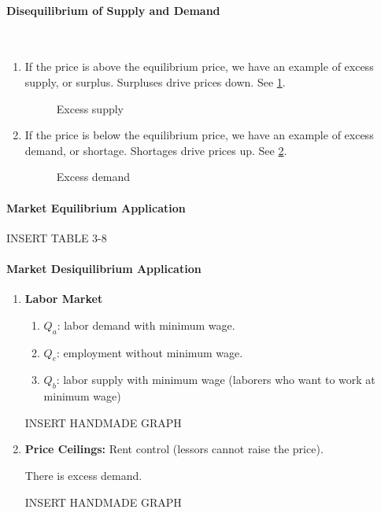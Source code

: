 \paragraph{Disequilibrium of Supply and Demand}\ 

\begin{enumerate}[label = \textbullet]

	\item If the price is above the equilibrium price, we have an example of excess supply, or surplus.
		Surpluses drive prices down.
		See \cref{fig:excess_supply}.

	\begin{figure}[ht]
		\centering
		\caption{Excess supply}
		\label{fig:excess_supply}
	\end{figure}

	\item If the price is below the equilibrium price, we have an example of excess demand, or shortage.
		Shortages drive prices up.
		See \cref{fig:excess_demand}.

	\begin{figure}[ht]
		\centering
		\caption{Excess demand}
		\label{fig:excess_demand}
	\end{figure}

\end{enumerate}

\paragraph{Market Equilibrium Application} INSERT TABLE 3-8

\paragraph{Market Desiquilibrium Application}

\begin{enumerate}[label = \textbf{(\Roman*)}]
	\item \textbf{Labor Market}

		\begin{enumerate}[label = ---]
			\item $Q_a$: labor demand with minimum wage.
			\item $Q_e$: employment without minimum wage.
			\item $Q_b$: labor supply with minimum wage (laborers who want to work at minimum wage)
		\end{enumerate}

		INSERT HANDMADE GRAPH

	\item \textbf{Price Ceilings:} Rent control (lessors cannot raise the price).

		There is excess demand.

		INSERT HANDMADE GRAPH
\end{enumerate}

